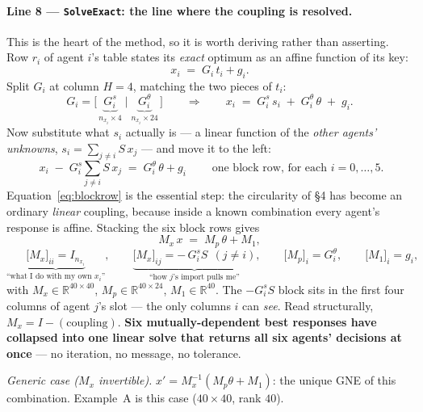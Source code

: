 \documentclass[11pt, letterpaper]{article}
\begin{document}
\paragraph{Line 8 --- \texttt{SolveExact}: the line where the coupling is resolved.}
This is the heart of the method, so it is worth deriving rather than asserting. Row $r_i$ of agent
$i$'s table states its \emph{exact} optimum as an affine function of its key:
\[
  x_i \;=\; G_i\,t_i + g_i .
\]
Split $G_i$ at column $H{=}4$, matching the two pieces of $t_i$:
\[
  G_i=\bigl[\,\underbrace{G_i^{s}}_{n_{x_i}\times4}\;\big|\;\underbrace{G_i^{\theta}}_{n_{x_i}\times24}\,\bigr]
  \qquad\Longrightarrow\qquad
  x_i \;=\; G_i^{s}\,s_i \;+\; G_i^{\theta}\,\theta \;+\; g_i .
\]
Now substitute what $s_i$ actually is --- a linear function of the \emph{other agents' unknowns},
$s_i=\sum_{j\ne i}S\,x_j$ --- and move it to the left:
\begin{equation}
  \boxed{\;x_i \;-\; G_i^{s}\!\!\sum_{j\ne i}S\,x_j \;=\; G_i^{\theta}\,\theta + g_i\;}
  \qquad\text{one block row, for each } i=0,\dots,5 .
  \label{eq:blockrow}
\end{equation}
Equation~\eqref{eq:blockrow} is the essential step: the circularity of \S4 has become an ordinary
\emph{linear} coupling, because inside a known combination every agent's response is affine. Stacking
the six block rows gives
\[
  M_x\,x \;=\; M_p\,\theta + M_1,
\]
\[
  \underbrace{\bigl[M_x\bigr]_{ii}=I_{n_{x_i}}}_{\text{``what I do with my own }x_i\text{''}},\qquad
  \underbrace{\bigl[M_x\bigr]_{ij}=-\,G_i^{s}S\ \ (j\ne i)}_{\text{``how }j\text{'s import pulls me''}},\qquad
  \bigl[M_p\bigr]_{i}=G_i^{\theta},\qquad
  \bigl[M_1\bigr]_{i}=g_i,
\]
with $M_x\in\mathbb R^{40\times40}$, $M_p\in\mathbb R^{40\times24}$, $M_1\in\mathbb R^{40}$. The
$-G_i^sS$ block sits in the first four columns of agent $j$'s slot --- the only columns $i$ can
\emph{see}. Read structurally, $M_x=I-(\text{coupling})$. \textbf{Six mutually-dependent best
responses have collapsed into one linear solve that returns all six agents' decisions at once} --- no
iteration, no message, no tolerance.

\smallskip
\emph{Generic case ($M_x$ invertible).} $x'=M_x^{-1}(M_p\theta+M_1)$: the unique GNE of this
combination. Example~A is this case ($40\times40$, rank $40$).
\end{document}
